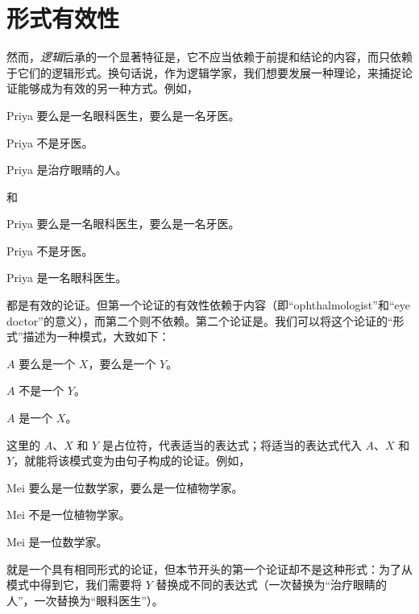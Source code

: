 \section{形式有效性}\label{s:FormalValidity}

然而，\emph{逻辑}后承的一个显著特征是，它不应当依赖于前提和结论的内容，而只依赖于它们的逻辑形式。换句话说，作为逻辑学家，我们想要发展一种理论，来捕捉论证能够成为有效的另一种方式。例如，

\begin{earg}
	\item[] Priya 要么是一名眼科医生，要么是一名牙医。
	\item[] Priya 不是牙医。
	\item[\texttherefore] Priya 是治疗眼睛的人。
\end{earg}

和

\begin{earg}
	\item[] Priya 要么是一名眼科医生，要么是一名牙医。
	\item[] Priya 不是牙医。
	\item[\texttherefore] Priya 是一名眼科医生。
\end{earg}

都是有效的论证。但第一个论证的有效性依赖于内容（即“ophthalmologist”和“eye doctor”的意义），而第二个则不依赖。第二个论证是。我们可以将这个论证的“形式”描述为一种模式，大致如下：

\begin{earg}
	\item[] $A$ 要么是一个 $X$，要么是一个 $Y$。
	\item[] $A$ 不是一个 $Y$。
	\item[\texttherefore] $A$ 是一个 $X$。
\end{earg}

这里的 $A$、$X$ 和 $Y$ 是占位符，代表适当的表达式；将适当的表达式代入 $A$、$X$ 和 $Y$，就能将该模式变为由句子构成的论证。例如，

\begin{earg}
	\item[] Mei 要么是一位数学家，要么是一位植物学家。
	\item[] Mei 不是一位植物学家。
	\item[\texttherefore] Mei 是一位数学家。
\end{earg}

就是一个具有相同形式的论证，但本节开头的第一个论证却不是这种形式：为了从模式中得到它，我们需要将 $Y$ 替换成不同的表达式（一次替换为“治疗眼睛的人”，一次替换为“眼科医生”）。

